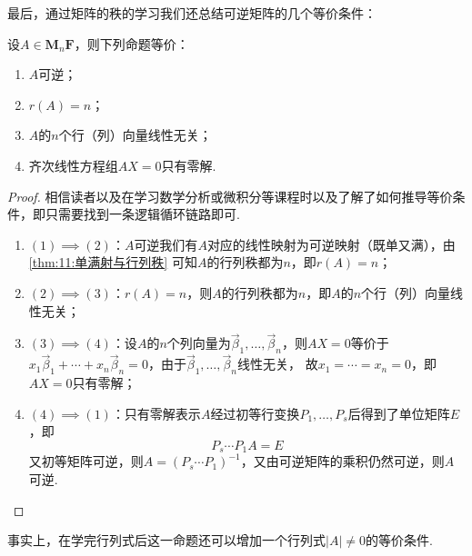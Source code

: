 最后，通过矩阵的秩的学习我们还总结可逆矩阵的几个等价条件：
\begin{theorem}\label{thm:11:可逆等价条件}
    设$A \in \mathbf{M}_n{\mathbf{F}}$，则下列命题等价：
    \begin{enumerate}
        \item $A$可逆；

        \item $r(A)=n$；

        \item $A$的$n$个行（列）向量线性无关；

        \item 齐次线性方程组$AX=0$只有零解.
    \end{enumerate}
\end{theorem}
\begin{proof}
    相信读者以及在学习数学分析或微积分等课程时以及了解了如何推导等价条件，即只需要找到一条逻辑循环链路即可.
    \begin{enumerate}
        \item $(1)\implies(2)$：$A$可逆我们有$A$对应的线性映射为可逆映射（既单又满），由\autoref{thm:11:单满射与行列秩}
        可知$A$的行列秩都为$n$，即$r(A)=n$；
        \item $(2)\implies(3)$：$r(A)=n$，则$A$的行列秩都为$n$，即$A$的$n$个行（列）向量线性无关；
        \item $(3)\implies(4)$：设$A$的$n$个列向量为$\vec{\beta}_1,\ldots,\vec{\beta}_n$，则$AX=0$等价于
        $x_1\vec{\beta}_1+\cdots+x_n\vec{\beta}_n=0$，由于$\vec{\beta}_1,\ldots,\vec{\beta}_n$线性无关，
        故$x_1=\cdots=x_n=0$，即$AX=0$只有零解；
        \item $(4)\implies(1)$：只有零解表示$A$经过初等行变换$P_1,\ldots,P_s$后得到了单位矩阵$E$，即
        \[P_s\cdots P_1A=E\]
        又初等矩阵可逆，则$A=(P_s\cdots P_1)^{-1}$，又由可逆矩阵的乘积仍然可逆，则$A$可逆.
    \end{enumerate}
\end{proof}

事实上，在学完行列式后这一命题还可以增加一个行列式$|A|\neq 0$的等价条件.

